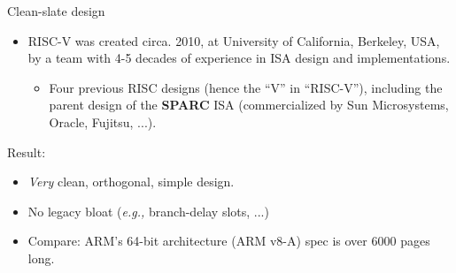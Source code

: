 \documentclass{article}
\newcommand{\eg}{\emph{e.g.,}}
\begin{document}
\begin{center}\LARGE
  {\Huge Clean-slate design}

  \vspace{1in}

  \begin{minipage}{9in}
    \begin{itemize}

    \item RISC-V was created circa. 2010, at University of California,
      Berkeley, USA, by a team with 4-5 decades of experience in ISA
      design and implementations.
      \begin{itemize}
        \item Four previous RISC designs (hence the ``V'' in
          ``RISC-V''), including the parent design of the {\bf SPARC} ISA
          (commercialized by Sun Microsystems, Oracle, Fujitsu, ...).
      \end{itemize}
    \end{itemize}
  \end{minipage}

  \vspace{1in}

  \begin{minipage}{9in}
    Result:
    \begin{itemize}
    \item \emph{Very} clean, orthogonal, simple design.
    \item No legacy bloat ({\eg} branch-delay slots, ...)
    \item Compare: ARM’s 64-bit architecture (ARM v8-A) spec is over 6000 pages long.
    \end{itemize}
  \end{minipage}

\end{center}

\clearpage

\end{document}
